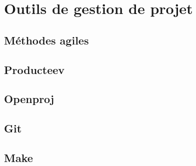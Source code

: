 \section{Outils de gestion de projet}

\subsection{Méthodes agiles}

\subsection{Producteev}

\subsection{Openproj}

\subsection{Git}

\subsection{Make}

